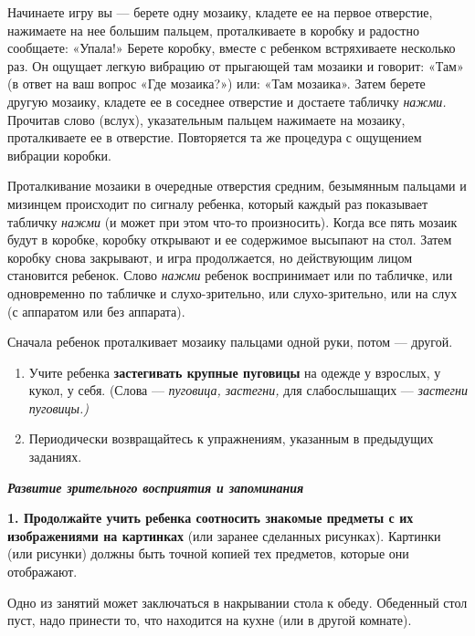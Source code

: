 \documentclass[a5paper]{book}
\renewcommand{\emph}[1]{\textit{#1}}
\begin{document}
Начинаете игру вы --- берете одну мозаику, кладете ее на первое
отверстие, нажимаете на нее большим пальцем, проталкиваете в коробку и
радостно сообщаете: «Упала!» Берете коробку, вместе с ребенком
встряхиваете несколько раз. Он ощущает легкую вибрацию от прыгающей там
мозаики и говорит: «Там» (в ответ на ваш вопрос «Где мозаика?») или:
«Там мозаика». Затем берете другую мозаику, кладете ее в соседнее
отверстие и достаете табличку \emph{нажми.} Прочитав слово (вслух),
указательным пальцем нажимаете на мозаику, проталкиваете ее в отверстие.
Повторяется та же процедура с ощущением вибрации коробки.

Проталкивание мозаики в очередные отверстия средним, безымянным пальцами
и мизинцем происходит по сигналу ребенка, который каждый раз показывает
табличку \emph{нажми} (и может при этом что-то произносить). Когда все
пять мозаик будут в коробке, коробку открывают и ее содержимое высыпают
на стол. Затем коробку снова закрывают, и игра продолжается, но
действующим лицом становится ребенок. Слово \emph{нажми} ребенок
воспринимает или по табличке, или одновременно по табличке и
слухо-зрительно, или слухо-зрительно, или на слух (с аппаратом или без
аппарата).

Сначала ребенок проталкивает мозаику пальцами одной руки, потом ---
другой.


\begin{enumerate}
\def\labelenumi{\arabic{enumi}.}
\setcounter{enumi}{7}
\item
  
  Учите ребенка \textbf{застегивать крупные пуговицы} на одежде у
  взрослых, у кукол, у себя. (Слова --- \emph{пуговица, застегни,} для
  слабослышащих --- \emph{застегни пуговицы.)}
  
\item
  
  Периодически возвращайтесь к упражнениям, указанным в предыдущих
  заданиях.
  
\end{enumerate}


\emph{\textbf{Развитие зрительного восприятия и запоминания}}

\textbf{1. Продолжайте учить ребенка соотносить знакомые предметы с их
изображениями на картинках} (или заранее сделанных рисунках). Картинки
(или рисунки) должны быть точной копией тех предметов, которые они
отображают.

Одно из занятий может заключаться в накрывании стола к обеду. Обеденный
стол пуст, надо принести то, что находится на кухне (или в другой
комнате).
\end{document}
